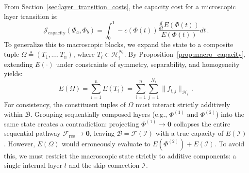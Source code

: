 \documentclass[11pt, a4paper, copyright, gdm]{google}
\newcommand{\zeroVect}{\boldsymbol{0}}
\newcommand{\calB}{\mathcal{B}}
\newcommand{\calF}{\mathcal{F}}
\newcommand{\calH}{\mathcal{H}}
\newcommand{\calI}{\mathcal{I}}
\newcommand{\calJ}{\mathcal{J}}
\theoremstyle{definition}
\begin{document}
From Section~\ref{sec:layer_transition_costs}, the capacity cost for a microscopic layer transition is:
\begin{equation}
    \label{eq:app_fundamental_ode_micro}
    \calJ_{\text{capacity}}(\Phi_a, \Phi_b) = \int_{0}^{1} -c(\Phi(t)) \frac{\frac{d}{dt} E(\Phi(t))}{E(\Phi(t))} dt \,.
\end{equation}
To generalize this to macroscopic blocks, we expand the state to a composite tuple $\Omega \triangleq (T_1, \dots, T_n)$, where $T_i \in \calH_i^{N_i}$. By Proposition~\ref{prop:macro_capacity}, extending $E(\cdot)$ under constraints of symmetry, separability, and homogeneity yields:
\begin{equation}
\label{eq:app_macro_capacity}
E(\Omega) = \sum_{i=1}^n E(T_i) = \sum_{i=1}^n \sum_{j=1}^{N_i} \|f_{i,j}\|_{\calH_i} \,.
\end{equation}
For consistency, the constituent tuples of $\Omega$ must interact strictly additively within $\calB$. Grouping sequentially composed layers (e.g., $\Phi^{(1)}$ and $\Phi^{(2)}$) into the same state creates a contradiction: projecting $\Phi^{(1)} \to \zeroVect$ collapses the entire sequential pathway $\calF_{\text{res}} \to \zeroVect$, leaving $\calB = \calF(\calI)$ with a true capacity of $E(\calI)$. However, $E(\Omega)$ would erroneously evaluate to $E(\Phi^{(2)}) + E(\calI)$. To avoid this, we must restrict the macroscopic state strictly to additive components: a single internal layer $l$ and the skip connection $\calI$. 
\end{document}
